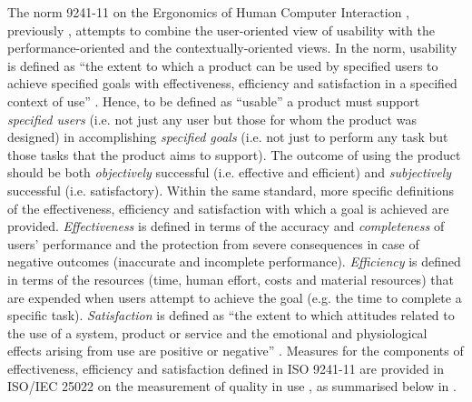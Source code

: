 The norm  9241-11 on the Ergonomics of Human Computer Interaction \citep{iso2018}, previously \citet{iso1998}, attempts to combine the user-oriented view of usability with the performance-oriented and the contextually-oriented views. In the norm, usability is defined as ``the extent to which a product can be used by specified users to achieve specified goals with effectiveness, efficiency and satisfaction in a specified context of use'' \citep{iso2018}. Hence, to be defined as ``usable'' a product must support \textit{specified users} (i.e. not just any user but those for whom the product was designed) in accomplishing \textit{specified goals} (i.e. not just to perform any task but those tasks that the product aims to support). The outcome of using the product should be both \textit{objectively} successful (i.e. effective and efficient) and \textit{subjectively} successful (i.e. satisfactory). Within the same standard, more specific definitions of the effectiveness, efficiency and satisfaction with which a goal is achieved are provided. \textit{Effectiveness} is defined in terms of the accuracy and \textit{completeness} of users’ performance and the protection from severe consequences in case of negative outcomes (inaccurate and incomplete performance). \textit{Efficiency} is defined in terms of the resources (time, human effort, costs and material resources) that are expended when users attempt to achieve the goal (e.g. the time to complete a specific task). \textit{Satisfaction} is defined as ``the extent to which attitudes related to the use of a system, product or service and the emotional and physiological effects arising from use are positive or negative'' \citep{iso2018}. Measures for the components of effectiveness, efficiency and satisfaction defined in ISO 9241-11 are provided in ISO/IEC 25022 on the measurement of quality in use \citep{iso2016}, as summarised below in .

